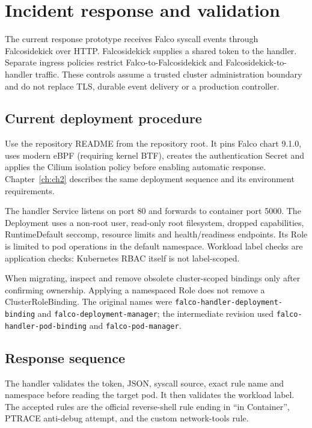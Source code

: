 \chapter{Incident response and validation}
\label{ch:ch4}

The current response prototype receives Falco syscall events through Falcosidekick
over HTTP. Falcosidekick supplies a shared token to the handler. Separate ingress
policies restrict Falco-to-Falcosidekick and Falcosidekick-to-handler traffic. These
controls assume a trusted cluster administration boundary and do not replace TLS,
durable event delivery or a production controller.

\section{Current deployment procedure}

Use the repository README from the repository root. It pins Falco chart 9.1.0,
uses modern eBPF (requiring kernel BTF), creates the authentication Secret and applies
the Cilium isolation policy before enabling automatic response. Chapter~\ref{ch:ch2}
describes the same deployment sequence and its environment requirements.

The handler Service listens on port 80 and forwards to container port 5000.
The Deployment uses a non-root user, read-only root filesystem, dropped capabilities,
RuntimeDefault seccomp, resource limits and health/readiness endpoints. Its Role is
limited to pod operations in the default namespace. Workload label checks are
application checks: Kubernetes RBAC itself is not label-scoped.

When migrating, inspect and remove obsolete cluster-scoped bindings only after
confirming ownership. Applying a namespaced Role does not remove a ClusterRoleBinding.
The original names were \texttt{falco-handler-deployment-binding} and
\texttt{falco-deployment-manager}; the intermediate revision used
\texttt{falco-handler-pod-binding} and \texttt{falco-pod-manager}.

\section{Response sequence}

The handler validates the token, JSON, syscall source, exact rule name and namespace
before reading the target pod. It then validates the workload label. The accepted
rules are the official reverse-shell rule ending in ``in Container'', PTRACE anti-debug
attempt, and the custom network-tools rule.

